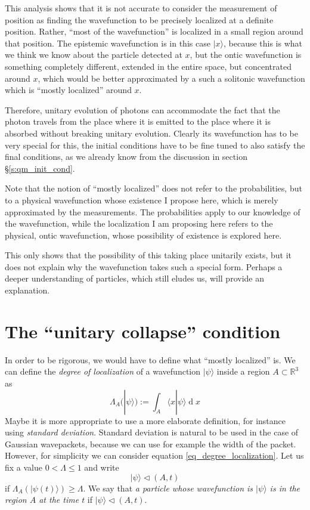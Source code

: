 \documentclass[12pt]{amsart}
\theoremstyle{definition}
\theoremstyle{plain}
\begin{document}
This analysis shows that it is not accurate to consider the measurement of position as finding the wavefunction to be precisely localized at a definite position. Rather, ``most of the wavefunction'' is localized in a small region around that position. The epistemic wavefunction is in this case $|{x}\rangle$, because this is what we think we know about the particle detected at $x$, but the ontic wavefunction is something completely different, extended in the entire space, but concentrated around $x$, which would be better approximated by a such a solitonic wavefunction which is ``mostly localized'' around $x$.

Therefore, unitary evolution of photons can accommodate the fact that the photon travels from the place where it is emitted to the place where it is absorbed without breaking unitary evolution. Clearly its wavefunction has to be very special for this, the initial conditions have to be fine tuned to also satisfy the final conditions, as we already know from the discussion in section \S\ref{s:qm_init_cond}.

Note that the notion of ``mostly localized'' does not refer to the probabilities, but to a physical wavefunction whose existence I propose here, which is merely approximated by the measurements. The probabilities apply to our knowledge of the wavefunction, while the localization I am proposing here refers to the physical, ontic wavefunction, whose possibility of existence is explored here.

This only shows that the possibility of this taking place unitarily exists, but it does not explain why the wavefunction takes such a special form. Perhaps a deeper understanding of particles, which still eludes us, will provide an explanation.


\section{The ``unitary collapse'' condition}
\label{s:unitary_collapse_condition}

In order to be rigorous, we would have to define what ``mostly localized'' is. We can define the \emph{degree of localization} of a wavefunction $|{\psi}\rangle$ inside a region $A\subset\mathbb{R}^3$ as
\begin{equation}
\label{eq_degree_localization}
\Lambda_A(|{\psi}\rangle):=\int_{A}\langle{x}|{\psi}\rangle\operatorname{d} x
\end{equation}
Maybe it is more appropriate to use a more elaborate definition, for instance using \emph{standard deviation}. Standard deviation is natural to be used in the case of Gaussian wavepackets, because we can use for example the width of the packet. However, for simplicity we can consider equation \eqref{eq_degree_localization}. Let us fix a value $0<\Lambda \leq 1$ and write
\begin{equation}
\label{eq_localization_region}
|{\psi}\rangle\triangleleft(A,t)
\end{equation}
if $\Lambda_A(|{\psi(t)}\rangle)\geq \Lambda$.
We say that \emph{a particle whose wavefunction is $|{\psi}\rangle$ is in the region $A$ at the time $t$} if $|{\psi}\rangle\triangleleft(A,t)$.
\end{document}
